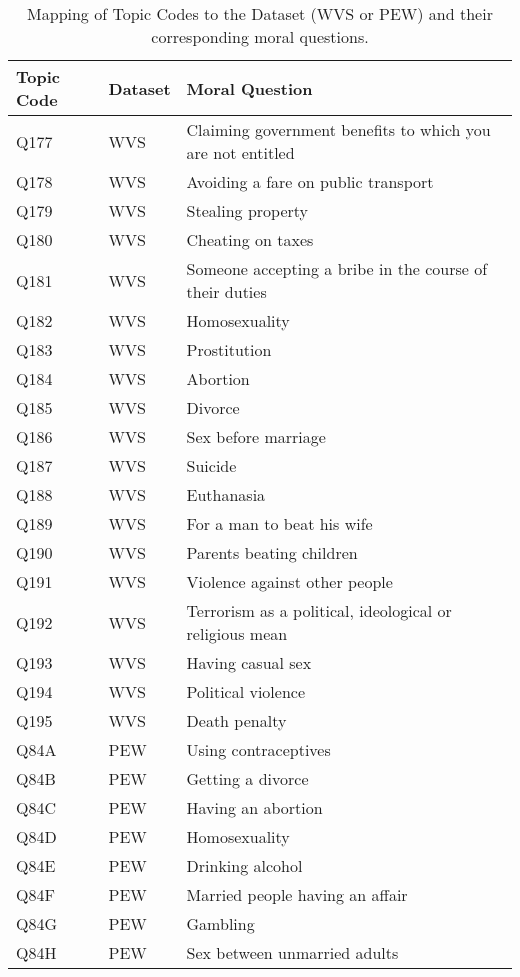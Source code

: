 \documentclass[11pt]{article}
\begin{document}
\begin{table}[ht]
\centering
\scriptsize
\renewcommand{\arraystretch}{1.1}
\caption{Mapping of Topic Codes to the Dataset (WVS or PEW) and their corresponding moral questions.}
\label{tab:topic_mapping}
\vspace{5pt}
\begin{tabular}{p{0.4cm}p{0.5cm}p{5.7cm}}
\toprule
\textbf{Topic Code} & \textbf{Dataset} & \textbf{Moral Question} \\ 
\midrule
Q177 & WVS & Claiming government benefits to which you are not entitled \\
Q178 & WVS & Avoiding a fare on public transport \\
Q179 & WVS & Stealing property \\
Q180 & WVS & Cheating on taxes \\
Q181 & WVS & Someone accepting a bribe in the course of their duties \\
Q182 & WVS & Homosexuality \\
Q183 & WVS & Prostitution \\
Q184 & WVS & Abortion \\
Q185 & WVS & Divorce \\
Q186 & WVS & Sex before marriage \\
Q187 & WVS & Suicide \\
Q188 & WVS & Euthanasia \\
Q189 & WVS & For a man to beat his wife \\
Q190 & WVS & Parents beating children \\
Q191 & WVS & Violence against other people \\
Q192 & WVS & Terrorism as a political, ideological or religious mean \\
Q193 & WVS & Having casual sex \\
Q194 & WVS & Political violence \\
Q195 & WVS & Death penalty \\
Q84A & PEW & Using contraceptives \\
Q84B & PEW & Getting a divorce \\
Q84C & PEW & Having an abortion \\
Q84D & PEW & Homosexuality \\
Q84E & PEW & Drinking alcohol \\
Q84F & PEW & Married people having an affair \\
Q84G & PEW & Gambling \\
Q84H & PEW & Sex between unmarried adults \\
\bottomrule
\end{tabular}
\end{table}
\end{document}

